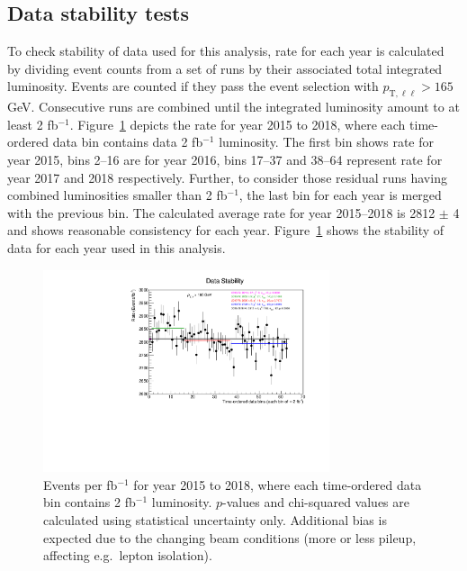 \subsection{Data stability tests}
\label{sec:data-stability}
To check stability of data used for this analysis, rate for each year is calculated by dividing event counts from a set of runs by their associated total integrated luminosity. Events are counted if they pass the event selection with $p_{\text{T},\ell\ell}>165$ GeV. Consecutive runs are combined until the integrated luminosity amount to at least 2 fb$^{-1}$. Figure~\ref{fig:DataStability} depicts the rate for year 2015 to 2018, where each time-ordered data bin contains data 2 fb$^{-1}$ luminosity. The first bin shows rate for year 2015, bins 2--16 are for year 2016, bins 17--37 and 38--64 represent rate for year 2017 and 2018 respectively. Further, to consider those residual runs having combined luminosities smaller than 2 fb$^{-1}$, the last bin for each year is merged with the previous bin. The calculated average rate for year 2015--2018 is 2812 $\pm$ 4 and shows reasonable consistency for each year. Figure~\ref{fig:DataStability} shows the stability of data for each year used in this analysis.
\begin{figure}[h!]
  \centering
  \includegraphics[width=0.75\textwidth]{figures/DataStability.pdf}
  \caption{Events per fb$^{-1}$ for year 2015 to 2018, where each time-ordered data bin contains 2 fb$^{-1}$ luminosity.
    $p$-values and chi-squared values are calculated using statistical uncertainty only. Additional bias is expected due to the changing beam conditions (more or less pileup, affecting e.g.\ lepton isolation).
  }
  \label{fig:DataStability}
\end{figure}

